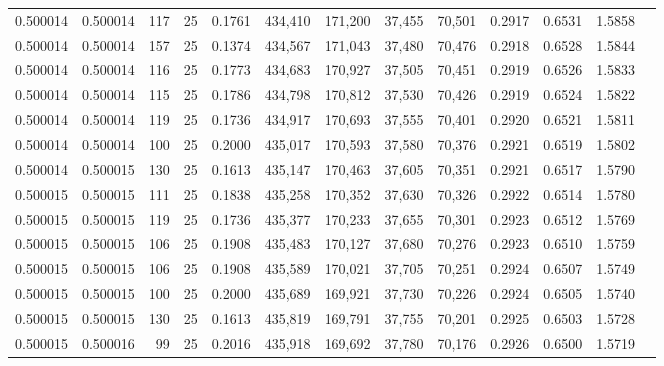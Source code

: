 \begin{tabular}{rrrrrrrrrrrrr}
0.500014 & 0.500014 &   117 &  25 &                                     0.1761 & 434,410 & 171,200 &  37,455 &  70,501 & 0.2917 & 0.6531 & 1.5858 \\
0.500014 & 0.500014 &   157 &  25 &                                     0.1374 & 434,567 & 171,043 &  37,480 &  70,476 & 0.2918 & 0.6528 & 1.5844 \\
0.500014 & 0.500014 &   116 &  25 &                                     0.1773 & 434,683 & 170,927 &  37,505 &  70,451 & 0.2919 & 0.6526 & 1.5833 \\
0.500014 & 0.500014 &   115 &  25 &                                     0.1786 & 434,798 & 170,812 &  37,530 &  70,426 & 0.2919 & 0.6524 & 1.5822 \\
0.500014 & 0.500014 &   119 &  25 &                                     0.1736 & 434,917 & 170,693 &  37,555 &  70,401 & 0.2920 & 0.6521 & 1.5811 \\
0.500014 & 0.500014 &   100 &  25 &                                     0.2000 & 435,017 & 170,593 &  37,580 &  70,376 & 0.2921 & 0.6519 & 1.5802 \\
0.500014 & 0.500015 &   130 &  25 &                                     0.1613 & 435,147 & 170,463 &  37,605 &  70,351 & 0.2921 & 0.6517 & 1.5790 \\
0.500015 & 0.500015 &   111 &  25 &                                     0.1838 & 435,258 & 170,352 &  37,630 &  70,326 & 0.2922 & 0.6514 & 1.5780 \\
0.500015 & 0.500015 &   119 &  25 &                                     0.1736 & 435,377 & 170,233 &  37,655 &  70,301 & 0.2923 & 0.6512 & 1.5769 \\
0.500015 & 0.500015 &   106 &  25 &                                     0.1908 & 435,483 & 170,127 &  37,680 &  70,276 & 0.2923 & 0.6510 & 1.5759 \\
0.500015 & 0.500015 &   106 &  25 &                                     0.1908 & 435,589 & 170,021 &  37,705 &  70,251 & 0.2924 & 0.6507 & 1.5749 \\
0.500015 & 0.500015 &   100 &  25 &                                     0.2000 & 435,689 & 169,921 &  37,730 &  70,226 & 0.2924 & 0.6505 & 1.5740 \\
0.500015 & 0.500015 &   130 &  25 &                                     0.1613 & 435,819 & 169,791 &  37,755 &  70,201 & 0.2925 & 0.6503 & 1.5728 \\
0.500015 & 0.500016 &    99 &  25 &                                     0.2016 & 435,918 & 169,692 &  37,780 &  70,176 & 0.2926 & 0.6500 & 1.5719 \\

\end{tabular}
